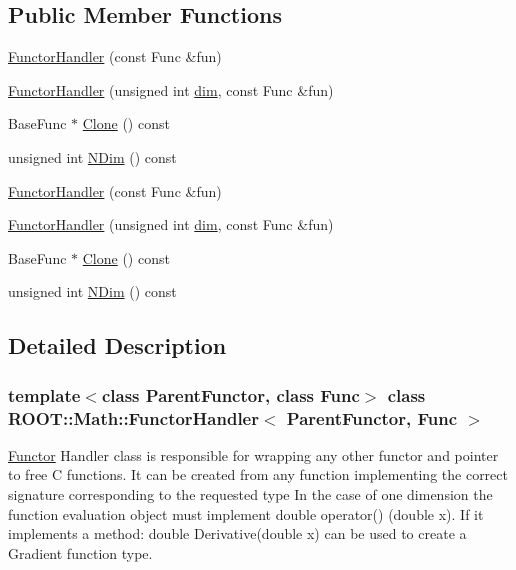 \subsection*{Public Member Functions}
\begin{DoxyCompactItemize}
\item 
\mbox{\hyperlink{classROOT_1_1Math_1_1FunctorHandler_ae8715a95fff0a4bbaba7a1641f936257}{Functor\+Handler}} (const Func \&fun)
\item 
\mbox{\hyperlink{classROOT_1_1Math_1_1FunctorHandler_a48929822606300cdd1da079313a981b4}{Functor\+Handler}} (unsigned int \mbox{\hyperlink{irrep__util_8cc_a70b5e28b5bc3d1b63a7435c5fe50b837}{dim}}, const Func \&fun)
\item 
Base\+Func $\ast$ \mbox{\hyperlink{classROOT_1_1Math_1_1FunctorHandler_ad20fb7defe76e6abc244eff203aabbc6}{Clone}} () const
\item 
unsigned int \mbox{\hyperlink{classROOT_1_1Math_1_1FunctorHandler_a448b3a68a8b9a55489a0b33b4cb26c93}{N\+Dim}} () const
\item 
\mbox{\hyperlink{classROOT_1_1Math_1_1FunctorHandler_ae8715a95fff0a4bbaba7a1641f936257}{Functor\+Handler}} (const Func \&fun)
\item 
\mbox{\hyperlink{classROOT_1_1Math_1_1FunctorHandler_a48929822606300cdd1da079313a981b4}{Functor\+Handler}} (unsigned int \mbox{\hyperlink{irrep__util_8cc_a70b5e28b5bc3d1b63a7435c5fe50b837}{dim}}, const Func \&fun)
\item 
Base\+Func $\ast$ \mbox{\hyperlink{classROOT_1_1Math_1_1FunctorHandler_ad20fb7defe76e6abc244eff203aabbc6}{Clone}} () const
\item 
unsigned int \mbox{\hyperlink{classROOT_1_1Math_1_1FunctorHandler_a448b3a68a8b9a55489a0b33b4cb26c93}{N\+Dim}} () const
\end{DoxyCompactItemize}


\subsection{Detailed Description}
\subsubsection*{template$<$class Parent\+Functor, class Func$>$\newline
class R\+O\+O\+T\+::\+Math\+::\+Functor\+Handler$<$ Parent\+Functor, Func $>$}

\mbox{\hyperlink{classROOT_1_1Math_1_1Functor}{Functor}} Handler class is responsible for wrapping any other functor and pointer to free C functions. It can be created from any function implementing the correct signature corresponding to the requested type In the case of one dimension the function evaluation object must implement double operator() (double x). If it implements a method\+: double Derivative(double x) can be used to create a Gradient function type.

